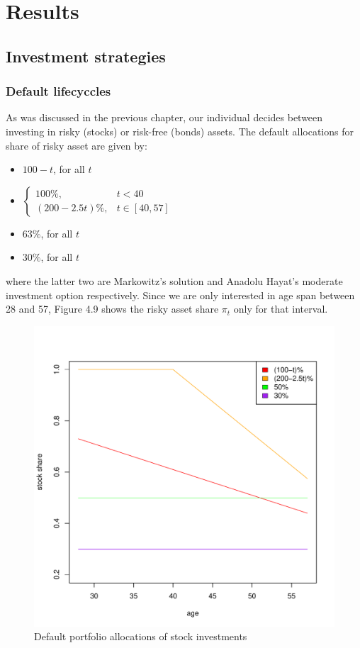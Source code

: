 \chapter{Results}
\label{results}

\section{Investment strategies}
\subsection{Default lifecyccles}
As was discussed in the previous chapter, our individual decides between investing in risky (stocks) or risk-free (bonds) assets. The default allocations for share of risky asset are given by:

\begin{itemize}
	\item $100-t$, for all $t$
	\item $\begin{cases} 100\%, & t<40\\(200-2.5t)\%, & t\in[40,57]\end{cases}$
	\item $63\%$, for all $t$
	\item $30\%$, for all $t$
\end{itemize}

where the latter two are Markowitz's solution and Anadolu Hayat's moderate investment option respectively. Since we are only interested in age span between 28 and 57, Figure 4.9 shows the risky asset share $\pi_t$ only for that interval. 

\begin{figure}[h]
	\centering
	\includegraphics[scale=0.6]{figs/defaults.pdf}
	\caption{Default portfolio allocations of stock investments}
\end{figure}


